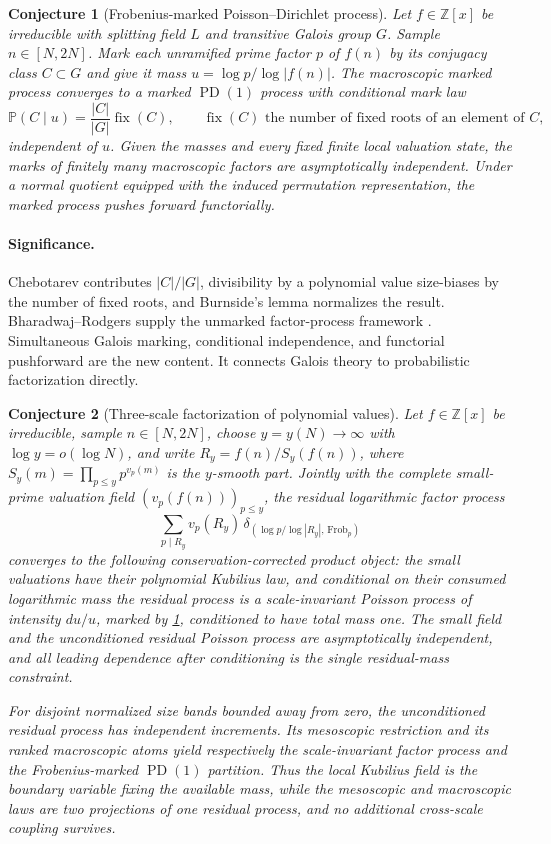 \documentclass[11pt]{article}
\newtheorem{conjecture}{Conjecture}
\newcommand{\PD}{\operatorname{PD}}
\newcommand{\Pp}{\mathbb P}
\newcommand{\Z}{\mathbb Z}
\begin{document}
\begin{conjecture}[Frobenius-marked Poisson--Dirichlet process]\label{c21}
Let $f\in\Z[x]$ be irreducible with splitting field $L$ and transitive Galois group
$G$.  Sample $n\in[N,2N]$.  Mark each unramified prime factor $p$ of $f(n)$ by its
conjugacy class $C\subset G$ and give it mass $u=\log p/\log|f(n)|$.  The macroscopic
marked process converges to a marked $\PD(1)$ process with conditional mark law
\[
 \Pp(C\mid u)=\frac{|C|}{|G|}\operatorname{fix}(C),\qquad\text{$\operatorname{fix}(C)$ the number of fixed roots of an element of $C$,}
\]
independent of $u$.  Given the masses and every fixed finite local valuation state, the
marks of finitely many macroscopic factors are asymptotically independent.  Under a
normal quotient equipped with the induced permutation representation, the marked
process pushes forward functorially.
\end{conjecture}

\paragraph{Significance.}
Chebotarev contributes $|C|/|G|$, divisibility by a polynomial value size-biases by the
number of fixed roots, and Burnside's lemma normalizes the result.  Bharadwaj--Rodgers
supply the unmarked factor-process framework \cite{BR}.  Simultaneous Galois marking,
conditional independence, and functorial pushforward are the new content.  It connects Galois
theory to probabilistic factorization directly.

\begin{conjecture}[Three-scale factorization of polynomial values]\label{c22}
Let $f\in\Z[x]$ be irreducible, sample $n\in[N,2N]$, choose
$y=y(N)\to\infty$ with $\log y=o(\log N)$, and write
$R_y=f(n)/S_y(f(n))$, where $S_y(m)=\prod_{p\le y}p^{v_p(m)}$ is the $y$-smooth
part.  Jointly with the complete small-prime valuation field
$(v_p(f(n)))_{p\le y}$, the residual logarithmic factor process
\[
 \sum_{p\mid R_y}v_p(R_y)\,
 \delta_{\left(\log p/\log|R_y|,\,\mathrm{Frob}_p\right)}
\]
converges to the following conservation-corrected product object: the small valuations
have their polynomial Kubilius law, and conditional on their consumed logarithmic mass
the residual process is a scale-invariant Poisson process of intensity $du/u$, marked by
\cref{c21}, conditioned to have total mass one.  The small field and the unconditioned
residual Poisson process are asymptotically independent, and all leading dependence
after conditioning is the single residual-mass constraint.

For disjoint normalized size bands bounded away from zero, the unconditioned residual
process has independent increments.  Its mesoscopic restriction and its ranked
macroscopic atoms yield respectively the scale-invariant factor process and the
Frobenius-marked $\PD(1)$ partition.  Thus the local Kubilius field is the boundary
variable fixing the available mass, while the mesoscopic and macroscopic laws are two
projections of one residual process, and no additional cross-scale coupling survives.
\end{conjecture}
\end{document}
